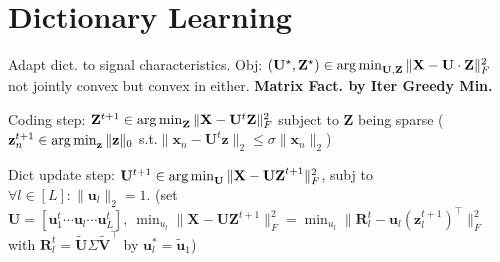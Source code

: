 \section{Dictionary Learning}

Adapt dict. to signal characteristics. Obj: $(\mathbf{U}^\star, \mathbf{Z}^\star) \in \operatorname*{arg\,min}_\mathbf{U,Z} \| \mathbf{X} - \mathbf{U} \cdot \mathbf{Z} \|_F^2$ not jointly convex but convex in either.
\textbf{Matrix Fact. by Iter Greedy Min.}
\begin{inparaenum}
  \item Coding step: $\mathbf{Z}^{t+1} \in \operatorname*{arg\,min}_\mathbf{Z} \| \mathbf{X} - \mathbf{U}^t \mathbf{Z} \|_F^2$ subject to $\mathbf{Z}$ being sparse ($\mathbf{z}_n^{t+1}\in \operatorname*{arg\,min}_\mathbf{z}\|\mathbf{z}\|_0$ s.t.$\|\mathbf{x}_n - \mathbf{U}^t\mathbf{z}\|_2 \le \sigma \|\mathbf{x}_n\|_2$)
  \item Dict update step: $\mathbf{U}^{t+1} \in \operatorname*{arg\,min}_\mathbf{U} \| \mathbf{X} - \mathbf{UZ}^{t+1} \|_F^2$, subj to $\forall l\in [L]:\|\mathbf{u}_l\|_2 = 1$. (set $\mathbf{U} = [\mathbf{u}_1^t\cdots \mathbf{u}_l\cdots \mathbf{u}_L^t],~ \min_{u_l}\|\mathbf{X} - \mathbf{U}\mathbf{Z}^{t+1}\|_F^2 = \min_{u_l}\|\mathbf{R}_l^t - \mathbf{u}_l(\mathbf{z}_l^{t+1})^\top\|_F^2$ with $\mathbf{R}_l^t = \tilde{\mathbf{U}}\Sigma\tilde{\mathbf{V}}^\top$ by $\mathbf{u}^*_l=\tilde{\mathbf{u}}_1$)
\end{inparaenum}
